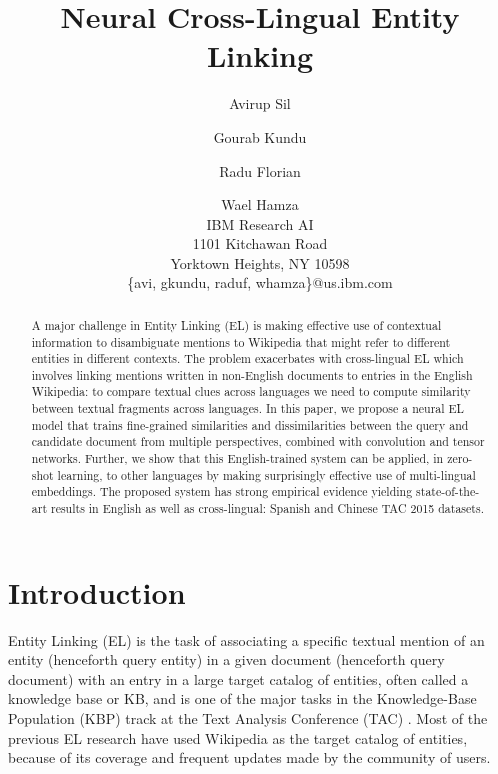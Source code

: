 \documentclass[letterpaper]{article} \usepackage{aaai18}  \usepackage{times}  \usepackage{helvet}  \usepackage{courier}  \usepackage{url}  \usepackage{graphicx}  \frenchspacing  \setlength{\pdfpagewidth}{8.5in}  \setlength{\pdfpageheight}{11in}  \usepackage{latexsym}
\begin{document}
\title{Neural Cross-Lingual Entity Linking}
\author{Avirup Sil \and Gourab Kundu \and Radu Florian \and Wael Hamza\\
IBM Research AI\\
1101 Kitchawan Road\\
Yorktown Heights, NY 10598\\
\{avi, gkundu, raduf, whamza\}@us.ibm.com
}
\maketitle
\begin{abstract}
A major challenge in Entity Linking (EL) is making effective use of contextual information to disambiguate mentions to Wikipedia that might refer to different entities in different contexts. The problem exacerbates with cross-lingual EL which involves linking mentions written in non-English documents to entries in the English Wikipedia: to compare textual clues across languages we need to compute similarity between textual fragments across languages. In this paper, we propose a neural EL model that trains fine-grained similarities and dissimilarities between the query and candidate document from multiple perspectives, combined with convolution and tensor networks. Further, we show that this English-trained system can be applied, in zero-shot learning, to other languages by making surprisingly effective use of multi-lingual embeddings. The proposed system has strong empirical evidence yielding state-of-the-art results in English as well as cross-lingual: Spanish and Chinese TAC 2015 datasets.



\end{abstract}

\section{Introduction}
Entity Linking (EL) is the task of associating a specific textual mention of an entity (henceforth query entity) in
a given document (henceforth query document) with an entry in a large target catalog of entities, often
called a knowledge base or KB, and is one of the major tasks in the
Knowledge-Base Population (KBP) track at the Text Analysis Conference (TAC) \cite{ji2014overview,ji2015overview}.
Most of the previous EL research \cite{2007-emnlp-conll-cucerzan-wikipedia-NE-disambig,2011-acl-illinois-wikifier,cikm-joint-nerel} have used Wikipedia as the target catalog of entities, because of its coverage and frequent updates made by the community of users. 
\end{document}
